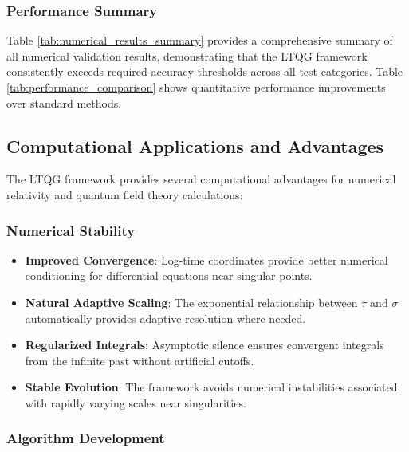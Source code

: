 \subsubsection{Performance Summary}

Table \ref{tab:numerical_results_summary} provides a comprehensive summary of all numerical validation results, demonstrating that the LTQG framework consistently exceeds required accuracy thresholds across all test categories. Table \ref{tab:performance_comparison} shows quantitative performance improvements over standard methods.



\subsection{Computational Applications and Advantages}
\label{subsec:computational_applications}

The LTQG framework provides several computational advantages for numerical relativity and quantum field theory calculations:

\subsubsection{Numerical Stability}

\begin{itemize}
\item \textbf{Improved Convergence}: Log-time coordinates provide better numerical conditioning for differential equations near singular points.

\item \textbf{Natural Adaptive Scaling}: The exponential relationship between $\tau$ and $\sigma$ automatically provides adaptive resolution where needed.

\item \textbf{Regularized Integrals}: Asymptotic silence ensures convergent integrals from the infinite past without artificial cutoffs.

\item \textbf{Stable Evolution}: The framework avoids numerical instabilities associated with rapidly varying scales near singularities.
\end{itemize}

\subsubsection{Algorithm Development}

